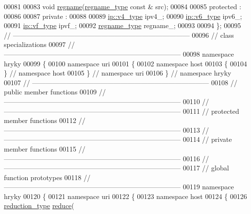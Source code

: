 \begin{DoxyCode}
00081 
00083     \textcolor{keywordtype}{void} \hyperlink{classhryky_1_1uri_1_1host_1_1_entity_af26c55ad20947d8aa771302034f73cc4}{regname}(\hyperlink{classhryky_1_1uri_1_1regname_1_1_entity}{regname_type} \textcolor{keyword}{const} & src);
00084 
00085 \textcolor{keyword}{protected} :
00086 
00087 \textcolor{keyword}{private} :
00088 
00089     \hyperlink{classhryky_1_1ip_1_1v4_1_1_entity}{ip::v4_type} ipv4\_;
00090     \hyperlink{classhryky_1_1ip_1_1v6_1_1_entity}{ip::v6_type} ipv6\_;
00091     \hyperlink{classhryky_1_1ip_1_1vf_1_1_entity}{ip::vf_type} ipvf\_;
00092     \hyperlink{classhryky_1_1uri_1_1regname_1_1_entity}{regname_type} regname\_;
00093 
00094 \};
00095 \textcolor{comment}{//
      ------------------------------------------------------------------------------}
00096 \textcolor{comment}{// class specializations}
00097 \textcolor{comment}{//
      ------------------------------------------------------------------------------}
00098 \textcolor{keyword}{namespace }hryky
00099 \{
00100 \textcolor{keyword}{namespace }uri
00101 \{
00102 \textcolor{keyword}{namespace }host
00103 \{
00104 \} \textcolor{comment}{// namespace host}
00105 \} \textcolor{comment}{// namespace uri}
00106 \} \textcolor{comment}{// namespace hryky}
00107 \textcolor{comment}{//
      ------------------------------------------------------------------------------}
00108 \textcolor{comment}{// public member functions}
00109 \textcolor{comment}{//
      ------------------------------------------------------------------------------}
00110 \textcolor{comment}{//
      ------------------------------------------------------------------------------}
00111 \textcolor{comment}{// protected member functions}
00112 \textcolor{comment}{//
      ------------------------------------------------------------------------------}
00113 \textcolor{comment}{//
      ------------------------------------------------------------------------------}
00114 \textcolor{comment}{// private member functions}
00115 \textcolor{comment}{//
      ------------------------------------------------------------------------------}
00116 \textcolor{comment}{//
      ------------------------------------------------------------------------------}
00117 \textcolor{comment}{// global function prototypes}
00118 \textcolor{comment}{//
      ------------------------------------------------------------------------------}
00119 \textcolor{keyword}{namespace }hryky
00120 \{
00121 \textcolor{keyword}{namespace }uri
00122 \{
00123 \textcolor{keyword}{namespace }host
00124 \{
00126     \hyperlink{namespacehryky_a343a9a4c36a586be5c2693156200eadc}{reduction_type} \hyperlink{namespacehryky_1_1uri_ab4530b241565d82fb0768bb29031858f}{reduce}(

\end{DoxyCode}
